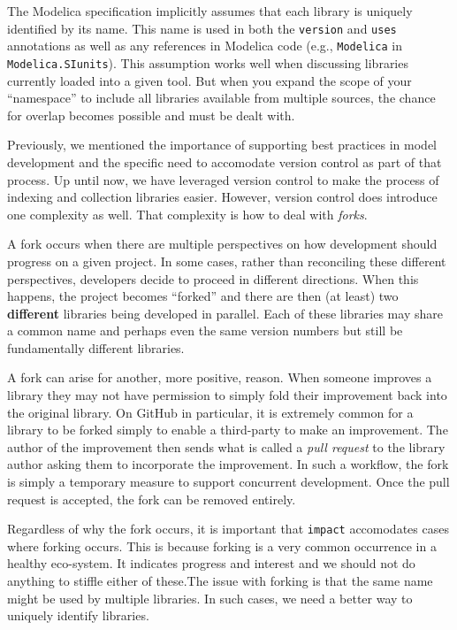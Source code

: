 \documentclass[11pt,a4paper,twocolumn]{article}
\newcommand{\code}[1]{\texttt{#1}} %
\begin{document}
The Modelica specification implicitly assumes that each library is
uniquely identified by its name.  This name is used in both the
\code{version} and \code{uses} annotations as well as any references
in Modelica code (e.g., \code{Modelica} in \code{Modelica.SIunits}).
This assumption works well when discussing libraries currently loaded
into a given tool.  But when you expand the scope of your
``namespace'' to include all libraries available from multiple
sources, the chance for overlap becomes possible and must be dealt
with.

Previously, we mentioned the importance of supporting best practices
in model development and the specific need to accomodate version
control as part of that process.  Up until now, we have leveraged
version control to make the process of indexing and collection
libraries easier.  However, version control does introduce one
complexity as well.  That complexity is how to deal with {\em forks}.

A fork occurs when there are multiple perspectives on how development
should progress on a given project.  In some cases, rather than
reconciling these different perspectives, developers decide to proceed
in different directions.  When this happens, the project becomes
``forked'' and there are then (at least) two {\bf different} libraries
being developed in parallel.  Each of these libraries may share a
common name and perhaps even the same version numbers but still be
fundamentally different libraries.

A fork can arise for another, more positive, reason.  When someone
improves a library they may not have permission to simply fold their
improvement back into the original library.  On GitHub in particular,
it is extremely common for a library to be forked simply to enable a
third-party to make an improvement.  The author of the improvement
then sends what is called a {\em pull request} to the library author
asking them to incorporate the improvement.  In such a workflow, the
fork is simply a temporary measure to support concurrent development.
Once the pull request is accepted, the fork can be removed entirely.

Regardless of why the fork occurs, it is important that \code{impact}
accomodates cases where forking occurs.  This is because forking is a
very common occurrence in a healthy eco-system.  It indicates progress
and interest and we should not do anything to stiffle either of
these.The issue with forking is that the same name might be used by
multiple libraries.  In such cases, we need a better way to uniquely
identify libraries.
\end{document}
